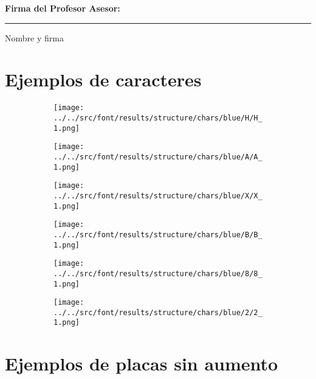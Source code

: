 \documentclass[12pt,a4paper]{article}
\begin{document}
\vspace{1cm}

\noindent
\textbf{Firma del Profesor Asesor:}

\vspace{2cm}

\noindent\rule{8cm}{0.4pt}  
Nombre y firma

\newpage

\section{Ejemplos de caracteres}

\begin{figure}[H]
  \begin{subfigure}[h]{0.32\textwidth}
    \texttt{[image: ../../src/font/results/structure/chars/blue/H/H\_1.png]}
  \end{subfigure}
  \begin{subfigure}[h]{0.32\textwidth}
    \texttt{[image: ../../src/font/results/structure/chars/blue/A/A\_1.png]}
  \end{subfigure}
  \begin{subfigure}[h]{0.32\textwidth}
    \texttt{[image: ../../src/font/results/structure/chars/blue/X/X\_1.png]}
  \end{subfigure}

  \begin{subfigure}[h]{0.32\textwidth}
    \texttt{[image: ../../src/font/results/structure/chars/blue/B/B\_1.png]}
  \end{subfigure}
  \begin{subfigure}[h]{0.3\textwidth}
    \texttt{[image: ../../src/font/results/structure/chars/blue/8/8\_1.png]}
  \end{subfigure}
  \begin{subfigure}[h]{0.32\textwidth}
    \texttt{[image: ../../src/font/results/structure/chars/blue/2/2\_1.png]}
  \end{subfigure}
\end{figure}

\section{Ejemplos de placas sin aumento}
\end{document}
